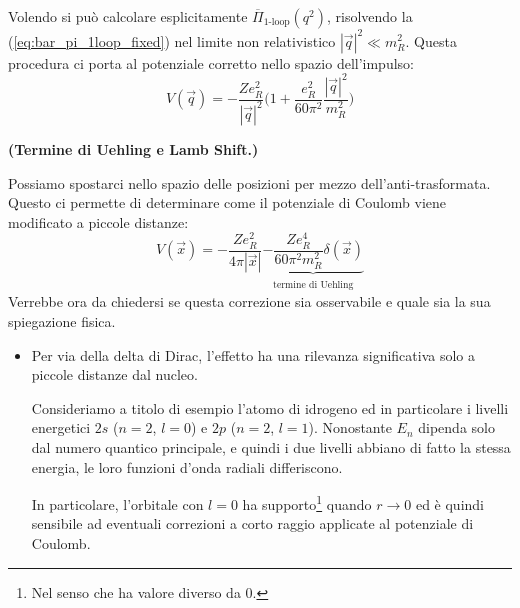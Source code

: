 \documentclass[../main.tex]{subfiles}
\begin{document}
Volendo si può calcolare esplicitamente $\overline{\Pi}_\text{1-loop}(q^2)$, risolvendo la (\ref{eq:bar_pi_1loop_fixed}) nel limite non relativistico \(|\Vec{q}|^2\ll m_R^2\). Questa procedura ci porta al potenziale corretto nello spazio dell'impulso:
\begin{equation}
    \boxed{V(\Vec q) = -\frac{Ze_R^2}{|\Vec{q}|^2}\Bigg( 1 + \frac{e_R^2}{60\pi^2} \frac{|\Vec{q}|^2}{m_R^2}\Bigg)}
    \label{eq:corrected_coulomb_scattering_potential_p-space}
\end{equation}
\begin{nota} \textbf{(Termine di Uehling e Lamb Shift.)}
    
    Possiamo spostarci nello spazio delle posizioni per mezzo dell'anti-trasformata. Questo ci permette di determinare come il potenziale di Coulomb viene modificato a piccole distanze:
    \begin{equation}
        {V(\Vec x) = -\frac{Ze_R^2}{4\pi|\Vec{x}|} \underbrace{-\frac{Ze_R^4}{60\pi^2 m_R^2}\delta(\Vec x)}_{\substack{\text{termine di }\text{Uehling}}} }
        \label{eq:corrected_coulomb_scattering_potential_x-space}
    \end{equation}
    Verrebbe ora da chiedersi se questa correzione sia osservabile e quale sia la sua spiegazione fisica.
    \begin{itemize}
        \item Per via della delta di Dirac, l'effetto ha una rilevanza significativa solo a piccole distanze dal nucleo. 
    
        Consideriamo a titolo di esempio l'atomo di idrogeno ed in particolare i livelli energetici $2s$ ($n=2$, $l=0$) e $2p$ ($n=2$, $l=1$). Nonostante $E_n$ dipenda solo dal numero quantico principale, e quindi i due livelli abbiano di fatto la stessa energia, le loro funzioni d'onda radiali differiscono.
    
        In particolare, l'orbitale con $l=0$ ha supporto\footnote{Nel senso che ha valore diverso da 0.} quando $r \rightarrow 0$ ed è quindi sensibile ad eventuali correzioni a corto raggio applicate al potenziale di Coulomb.
    

\end{itemize}
\end{nota}
\end{document}
